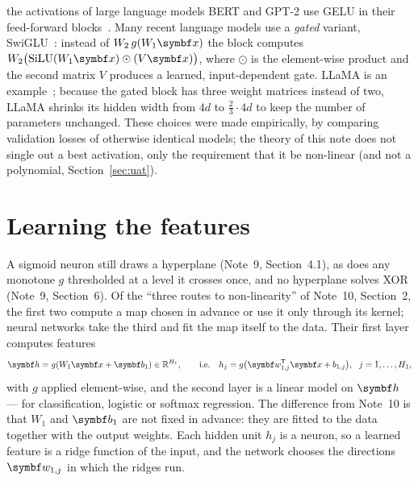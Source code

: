 \documentclass[11pt]{article}
\newcommand{\w}{\vect{w}}
\newcommand{\hv}{\vect{h}}
\newcommand{\vb}{\vect{b}}
\begin{document}
\begin{modern}{the activations of large language models}
BERT and GPT-2 use GELU in their feed-forward blocks~\cite{devlin2019,radford2019}. Many recent language models use a
\emph{gated} variant, SwiGLU~\cite{shazeer2020}: instead of $W_2\,g(W_1\x)$ the block computes
$W_2\big(\mathrm{SiLU}(W_1\x) \odot (V\x)\big)$, where $\odot$ is the element-wise product and the second matrix $V$
produces a learned, input-dependent gate. LLaMA is an example~\cite{touvron2023}; because the gated block has
three weight matrices instead of two, LLaMA shrinks its hidden width from $4d$ to $\frac23 \cdot 4d$ to keep the number
of parameters unchanged. These choices were made empirically, by comparing validation losses of otherwise identical
models; the theory of this note does not single out a best activation, only the requirement that it be non-linear
(and not a polynomial, Section~\ref{sec:uat}).
\end{modern}

\section{Learning the features}\label{sec:learned}

A sigmoid neuron still draws a hyperplane (Note~9, Section~4.1), as does any monotone $g$ thresholded at a level
it crosses once, and no hyperplane solves XOR (Note~9, Section~6). Of the ``three routes to non-linearity'' of Note~10,
Section~2, the first two compute a map chosen in advance or use it only through its kernel; neural networks take the
third and fit the map itself to the data. Their first layer computes features
\begin{equation}\label{eq:learnedfeat}
  \hv = g(W_1\x + \vb_1) \in \R^{H_1}, \qquad \text{i.e.} \quad h_j = g\big(\w_{1,j}\T\x + b_{1,j}\big),\ \ j = 1, \dots, H_1 ,
\end{equation}
with $g$ applied element-wise, and the second layer is a linear model on $\hv$ --- for classification, logistic or
softmax regression. The difference from Note~10 is that $W_1$ and $\vb_1$ are not fixed in advance: they are fitted to
the data together with the output weights. Each hidden unit $h_j$ is a neuron, so a learned feature is a ridge
function of the input, and the network chooses the directions $\w_{1,j}$ in which the ridges run.
\end{document}
